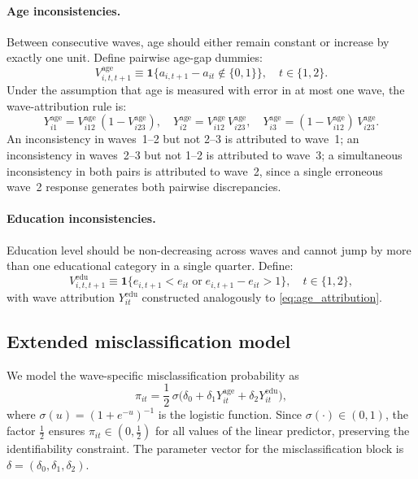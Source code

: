 \documentclass[12pt]{article}
\begin{document}
\paragraph{Age inconsistencies.}
Between consecutive waves, age should either remain constant or increase
by exactly one unit. Define pairwise age-gap dummies:
\[
V_{i,t,t+1}^{\text{age}} \equiv
\mathbf{1}\!\Big\{a_{i,t+1} - a_{it} \notin \{0, 1\}\Big\},
\quad t \in \{1, 2\}.
\]
Under the assumption that age is measured with error in at most one wave,
the wave-attribution rule is:
\begin{equation}
Y_{i1}^{\text{age}} = V_{i12}^{\text{age}}\,(1 - V_{i23}^{\text{age}}), \quad
Y_{i2}^{\text{age}} = V_{i12}^{\text{age}}\, V_{i23}^{\text{age}}, \quad
Y_{i3}^{\text{age}} = (1 - V_{i12}^{\text{age}})\, V_{i23}^{\text{age}}.
\label{eq:age_attribution}
\end{equation}
An inconsistency in waves~1--2 but not 2--3 is attributed to wave~1; an
inconsistency in waves~2--3 but not 1--2 is attributed to wave~3; a
simultaneous inconsistency in both pairs is attributed to wave~2, since
a single erroneous wave~2 response generates both pairwise discrepancies.

\paragraph{Education inconsistencies.}
Education level should be non-decreasing across waves and cannot jump by
more than one educational category in a single quarter. Define:
\[
V_{i,t,t+1}^{\text{edu}} \equiv
\mathbf{1}\!\Big\{e_{i,t+1} < e_{it} \;\text{or}\;
e_{i,t+1} - e_{it} > 1\Big\},
\quad t \in \{1, 2\},
\]
with wave attribution \(Y_{it}^{\text{edu}}\) constructed analogously
to \eqref{eq:age_attribution}.

\subsection{Extended misclassification model}

We model the wave-specific misclassification probability as
\begin{equation}
\pi_{it} = \frac{1}{2}\,
  \sigma\!\Big(\delta_0 + \delta_1 Y_{it}^{\text{age}} + \delta_2 Y_{it}^{\text{edu}}\Big),
\label{eq:pi_link}
\end{equation}
where \(\sigma(u) = (1 + e^{-u})^{-1}\) is the logistic function. Since
\(\sigma(\cdot) \in (0, 1)\), the factor \(\tfrac{1}{2}\) ensures
\(\pi_{it} \in (0, \tfrac{1}{2})\) for all values of the linear
predictor, preserving the identifiability constraint. The parameter
vector for the misclassification block is
\(\delta = (\delta_0, \delta_1, \delta_2)\).
\end{document}
